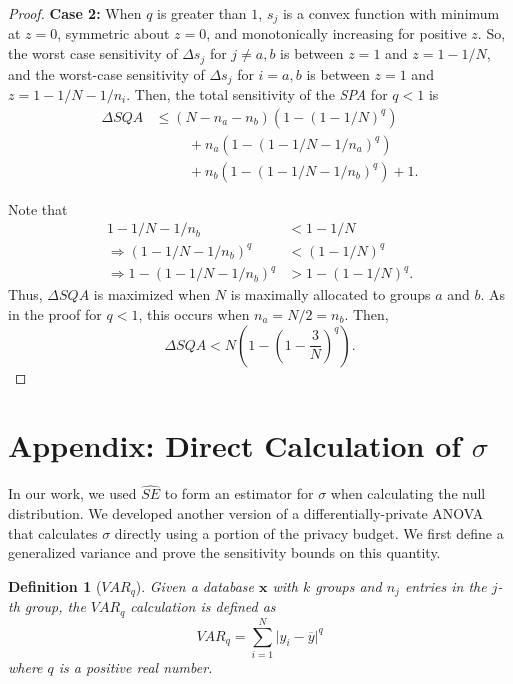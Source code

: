 \documentclass[USenglish,oneside]{article}
\newcounter{ab}
\newcounter{ar}
\newcounter{igh}
\newtheorem{definition}{Definition}
\newcommand{\sqa}{\textit{SQA}\xspace}
\newcommand{\spa}{\textit{SPA}\xspace}
\newcommand{\var}{\textit{VAR}\xspace}
\newcommand{\x}{\ensuremath{\mathbf{x}}\xspace}
\begin{document}
\begin{proof}
\noindent\textbf{Case 2:} When $q$ is greater than $1$, $s_j$ is a convex function with minimum at $z=0$, symmetric about $z=0$, and monotonically increasing for positive $z$. So, the worst case sensitivity of $\Delta s_j$ for $j \ne a,b$ is between $z= 1$ and $z=1-1/N$, and the worst-case sensitivity of $\Delta s_j$ for $i=a,b$ is between $z=1$ and $z = 1 - 1/N - 1/n_i$. Then, the total sensitivity of the \spa for $q<1$ is
%
\begin{align*}
\Delta\sqa &\le  (N-n_a-n_b)(1-(1-1/N)^q) \\
    & \hspace{1cm} + n_a(1-(1-1/N-1/n_a)^q) \\
	& \hspace{1cm} + n_b(1-(1-1/N-1/n_b)^q) + 1.
\end{align*}

Note that 
\begin{align*}
1-1/N-1/n_b &< 1-1/N \\
\Rightarrow (1-1/N-1/n_b)^q &< (1-1/N)^q \\
\Rightarrow 1 - (1-1/N-1/n_b)^q &> 1- (1-1/N)^q.
\end{align*}
Thus, $\Delta\sqa$ is maximized when $N$ is maximally allocated to groups $a$ and $b$. As in the proof for $q<1$, this occurs when $n_a = N/2 = n_b$. Then, 
$$\Delta\sqa < N \left( 1 - \left( 1 - \frac{3}{N}\right)^q \right).$$
\end{proof}


\section{Appendix: Direct Calculation of $\sigma$}
\label{Sec:AppDirSig}

In our work, we used $\widehat{SE}$ to form an estimator for $\sigma$ when calculating the null distribution.  We developed another version of a differentially-private ANOVA that calculates $\sigma$ directly using a portion of the privacy budget.  We first define a generalized variance and prove the sensitivity bounds on this quantity.

\begin{definition}[$\var_q$] \label{def:varq} Given a database \x with $k$ groups and $n_j$ entries in the $j$-th group, the $\var_q$ calculation is defined as
\begin{equation*}
\var_q = \sum_{i=1}^N \lvert y_{i} - \overline{y} \rvert^q
\end{equation*}
where $q$ is a positive real number.
\end{definition}
\end{document}
